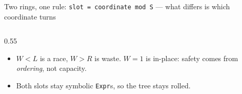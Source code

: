 \begin{frame}{Two rings, one rule: \texttt{slot = coordinate mod S} --- what differs is which coordinate turns}
\begin{columns}[T]
\begin{column}{0.55\textwidth}
\begin{itemize}
\item $W<L$ is a race, $W>R$ is waste. $W=1$ is in-place: safety comes from \emph{ordering}, not capacity.
\item Both slots stay symbolic \texttt{Expr}s, so the tree stays rolled.
\end{itemize}
\vspace{2pt}
\end{column}
\end{columns}
\end{frame}
